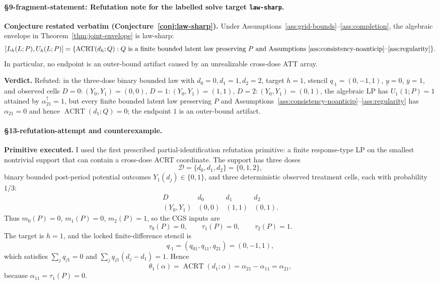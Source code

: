 \paragraph{\S9-fragment-statement: Refutation note for the labelled solve target \texttt{law-sharp}.}\label{prop:law-sharp-refuted}
\textbf{Conjecture restated verbatim (Conjecture~\ref{conj:law-sharp}).} Under Assumptions~\ref{ass:grid-bounds}--\ref{ass:completion}, the algebraic
envelope in Theorem~\ref{thm:joint-envelope} is law-sharp:
\[
  [L_h(L;P),U_h(L;P)]
  =
  \{\operatorname{ACRT}(d_h;Q):Q \text{ is a finite bounded latent law
  preserving } P \text{ and Assumptions } \ref{ass:consistency-noanticip}
  \text{--}\ref{ass:regularity}\}.
\]
In particular, no endpoint is an outer-bound artifact caused by an
unrealizable cross-dose ATT array.

\textbf{Verdict.} Refuted: in the three-dose binary bounded law with \(d_0=0,d_1=1,d_2=2\), target \(h=1\), stencil \(q_{\cdot 1}=(0,-1,1)\), \(\underline y=0\), \(\overline y=1\), and observed cells \(D=0:(Y_0,Y_1)=(0,0)\), \(D=1:(Y_0,Y_1)=(1,1)\), \(D=2:(Y_0,Y_1)=(0,1)\), the algebraic LP has \(U_1(1;P)=1\) attained by \(\alpha^\dagger_{21}=1\), but every finite bounded latent law preserving \(P\) and Assumptions~\ref{ass:consistency-noanticip}--\ref{ass:regularity} has \(\alpha_{21}=0\) and hence \(\operatorname{ACRT}(d_1;Q)=0\); the endpoint \(1\) is an outer-bound artifact.

\paragraph{\S13-refutation-attempt and counterexample.}
\textbf{Primitive executed.} I used the first prescribed partial-identification refutation primitive: a finite response-type LP on the smallest nontrivial support that can contain a cross-dose ACRT coordinate.  The support has three doses
\[
  \mathcal D=\{d_0,d_1,d_2\}=\{0,1,2\},
\]
binary bounded post-period potential outcomes \(Y_1(d_j)\in\{0,1\}\), and three deterministic observed treatment cells, each with probability \(1/3\):
\[
\begin{array}{c|ccc}
  D & d_0 & d_1 & d_2\\ \hline
  (Y_0,Y_1) & (0,0) & (1,1) & (0,1).
\end{array}
\]
Thus \(m_0(P)=0\), \(m_1(P)=0\), \(m_2(P)=1\), so the CGS inputs are
\[
  \tau_0(P)=0,\qquad \tau_1(P)=0,\qquad \tau_2(P)=1.
\]
The target is \(h=1\), and the locked finite-difference stencil is
\[
  q_{\cdot 1}=(q_{01},q_{11},q_{21})=(0,-1,1),
\]
which satisfies \(\sum_j q_{j1}=0\) and
\(\sum_j q_{j1}(d_j-d_1)=1\).  Hence
\[
  \theta_1(\alpha)=\operatorname{ACRT}(d_1;\alpha)
  =\alpha_{21}-\alpha_{11}=\alpha_{21},
\]
because \(\alpha_{11}=\tau_1(P)=0\).

